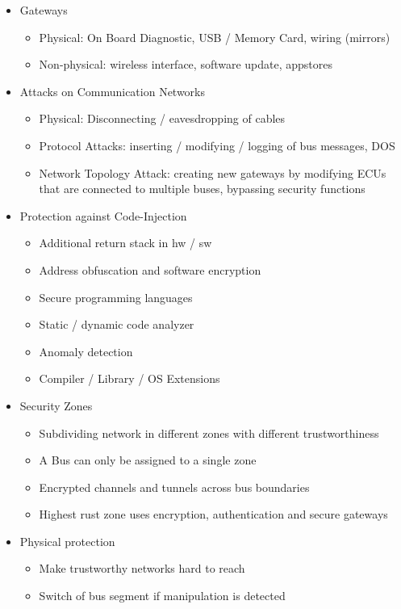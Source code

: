 \documentclass[11pt, paper=a4, twocolumn]{scrartcl}
\begin{document}
\begin{itemize}
			\item Gateways
				\begin{itemize}
					\item Physical: On Board Diagnostic, USB / Memory Card, wiring (mirrors)
					\item Non-physical: wireless interface, software update, appstores
				\end{itemize}
			\item Attacks on Communication Networks
				\begin{itemize}
					\item Physical: Disconnecting / eavesdropping of cables
					\item Protocol Attacks: inserting / modifying / logging of bus messages, DOS
					\item Network Topology Attack: creating new gateways by modifying ECUs that are connected to multiple buses, 
						bypassing security functions
				\end{itemize}
			\item Protection against Code-Injection
				\begin{itemize}
					\item Additional return stack in hw / sw
					\item Address obfuscation and software encryption
					\item Secure programming languages
					\item Static / dynamic code analyzer
					\item Anomaly detection
					\item Compiler / Library / OS Extensions
				\end{itemize}
			\item Security Zones
				\begin{itemize}
					\item Subdividing network in different zones with different trustworthiness
					\item A Bus can only be assigned to a single zone
					\item Encrypted channels and tunnels across bus boundaries
					\item Highest rust zone uses encryption, authentication and secure gateways
				\end{itemize}
			\item Physical protection
				\begin{itemize}
					\item Make trustworthy networks hard to reach
					\item Switch of bus segment if manipulation is detected

\end{itemize}
\end{itemize}
\end{document}
